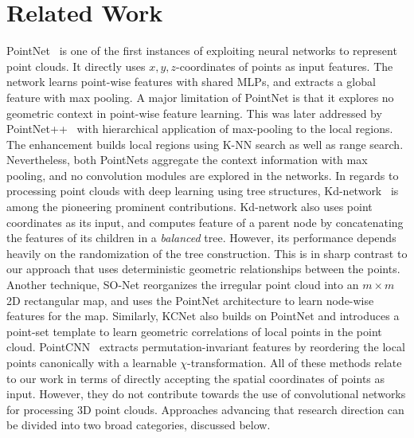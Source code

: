 \documentclass[10pt,twocolumn,letterpaper]{article}
\begin{document}
\section{Related Work}
PointNet~\cite{qi2017pointnet} is one of the first instances of exploiting neural networks to represent point clouds. It directly uses $x,y,z$-coordinates of points as input features. The network learns point-wise features with shared MLPs, and extracts a global feature with max pooling. A major limitation of PointNet is that it explores no geometric context in point-wise feature learning. This was later addressed by PointNet++~\cite{qi2017pointnetplusplus} with hierarchical application of max-pooling to the local regions.  The enhancement builds local regions  using K-NN search as well as range search. Nevertheless, both PointNets \cite{qi2017pointnet,qi2017pointnetplusplus} aggregate the  context information with max pooling, and no convolution modules are explored in the networks. 
In regards to processing point clouds with deep learning  using tree structures, Kd-network~\cite{klokov2017escape} is among the pioneering prominent contributions. Kd-network also uses point coordinates as its input, and computes feature of a parent node by concatenating the features of its children in a \emph{balanced} tree. However, its performance depends heavily on the randomization of the tree construction. This is in sharp contrast to our approach that uses deterministic geometric relationships between the points. 
Another technique, SO-Net \cite{li2018so} reorganizes the irregular point cloud into an $m\times m$ 2D rectangular map, and uses the PointNet architecture to learn
node-wise features for the map. Similarly, KCNet \cite{shen2018mining} also builds on PointNet and 
introduces a point-set template to learn geometric correlations of local points in the point cloud.  PointCNN~\cite{li2018pointcnn} extracts permutation-invariant features by reordering the local points canonically with a learnable $\chi$-transformation. 
All of these methods relate to our work in terms of directly accepting the spatial coordinates of points as  input. However, they do not contribute towards the use of  convolutional networks for processing 3D point clouds. Approaches advancing that research direction can be divided into two broad categories, discussed below.  




\vspace{-2mm}
\end{document}
